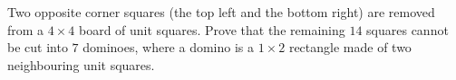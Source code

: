 Two opposite corner squares (the top left and the bottom right) are removed from a $4\times4$ board of unit squares. Prove that the remaining $14$ squares cannot be cut into $7$ dominoes, where a domino is a $1\times2$ rectangle made of two neighbouring unit squares.
